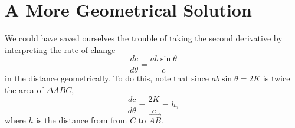 \documentclass{ximera}
\begin{document}
\section*{A More Geometrical Solution}
We could have saved ourselves the trouble of taking the second derivative by interpreting the rate of change
\[
    \frac{dc}{d\theta} = \frac{ab\sin \theta}{c} 
\]
in the distance geometrically. To do this, note that since $ab\sin\theta = 2K$ is twice the area of $\Delta ABC$,
\[
      \frac{dc}{d\theta} = \frac{2K}{c}  = h,
\]
where $h$ is the distance from from $C$ to $\overrightarrow{AB}$.
\end{document}
